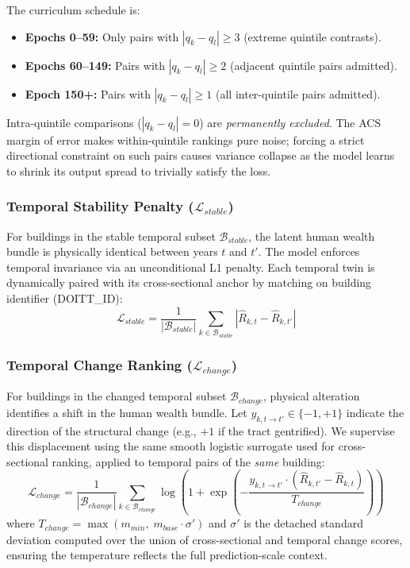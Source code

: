 \documentclass{article}
\begin{document}
The curriculum schedule is:
\begin{itemize}
    \item \textbf{Epochs 0--59:} Only pairs with $|q_k - q_l| \geq 3$ (extreme quintile contrasts).
    \item \textbf{Epochs 60--149:} Pairs with $|q_k - q_l| \geq 2$ (adjacent quintile pairs admitted).
    \item \textbf{Epoch 150+:} Pairs with $|q_k - q_l| \geq 1$ (all inter-quintile pairs admitted).
\end{itemize}
Intra-quintile comparisons ($|q_k - q_l| = 0$) are \textit{permanently excluded}. The ACS margin of error makes within-quintile rankings pure noise; forcing a strict directional constraint on such pairs causes variance collapse as the model learns to shrink its output spread to trivially satisfy the loss.

\subsubsection{Temporal Stability Penalty ($\mathcal{L}_{stable}$)}

For buildings in the stable temporal subset $\mathcal{B}_{stable}$, the latent human wealth bundle is physically identical between years $t$ and $t'$. The model enforces temporal invariance via an unconditional L1 penalty. Each temporal twin is dynamically paired with its cross-sectional anchor by matching on building identifier (DOITT\_ID):
\begin{equation}
\mathcal{L}_{stable} = \frac{1}{|\mathcal{B}_{stable}|} \sum_{k \in \mathcal{B}_{stable}} \left| \hat{R}_{k,t} - \hat{R}_{k,t'} \right|
\end{equation}

\subsubsection{Temporal Change Ranking ($\mathcal{L}_{change}$)}

For buildings in the changed temporal subset $\mathcal{B}_{change}$, physical alteration identifies a shift in the human wealth bundle. Let $y_{k, t \to t'} \in \{-1, +1\}$ indicate the direction of the structural change (e.g., $+1$ if the tract gentrified). We supervise this displacement using the same smooth logistic surrogate used for cross-sectional ranking, applied to temporal pairs of the \textit{same} building:
\begin{equation}
\mathcal{L}_{change} = \frac{1}{|\mathcal{B}_{change}|} \sum_{k \in \mathcal{B}_{change}} \log\!\left(1 + \exp\!\left(-\frac{y_{k,t\to t'} \cdot (\hat{R}_{k,t'} - \hat{R}_{k,t})}{T_{change}}\right)\right)
\end{equation}
where $T_{change} = \max(m_{min}, \; m_{base} \cdot \sigma')$ and $\sigma'$ is the detached standard deviation computed over the union of cross-sectional and temporal change scores, ensuring the temperature reflects the full prediction-scale context.
\end{document}
